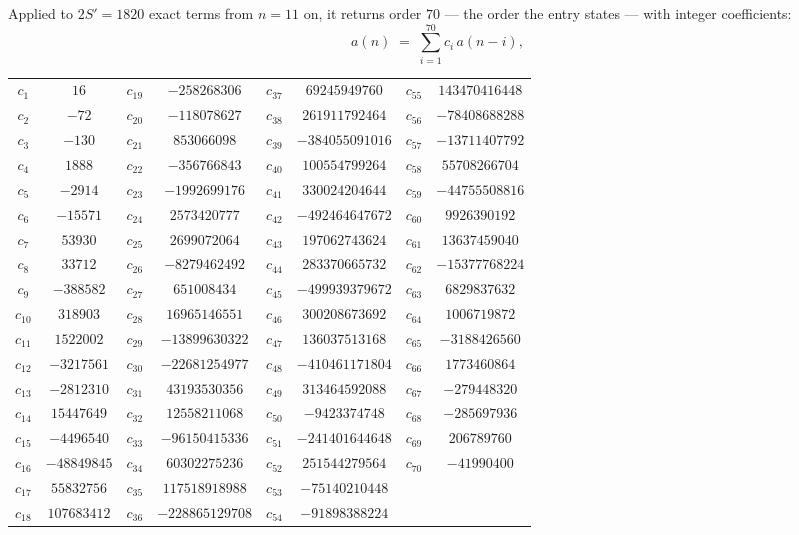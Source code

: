 \documentclass[11pt,a4paper]{article}
\theoremstyle{plain}
\theoremstyle{definition}
\begin{document}
Applied to $2S'=1820$ exact terms from $n=11$ on, it returns order $70$ --- the
order the entry states --- with integer coefficients:
\[
a(n)\;=\;\sum_{i=1}^{70}c_i\,a(n-i),
\]
\begin{center}\small
\begin{tabular}{cccccccc}
$c_{1}$ & $16$ & $c_{19}$ & $-258268306$ & $c_{37}$ & $69245949760$ & $c_{55}$ & $143470416448$ \\
$c_{2}$ & $-72$ & $c_{20}$ & $-118078627$ & $c_{38}$ & $261911792464$ & $c_{56}$ & $-78408688288$ \\
$c_{3}$ & $-130$ & $c_{21}$ & $853066098$ & $c_{39}$ & $-384055091016$ & $c_{57}$ & $-13711407792$ \\
$c_{4}$ & $1888$ & $c_{22}$ & $-356766843$ & $c_{40}$ & $100554799264$ & $c_{58}$ & $55708266704$ \\
$c_{5}$ & $-2914$ & $c_{23}$ & $-1992699176$ & $c_{41}$ & $330024204644$ & $c_{59}$ & $-44755508816$ \\
$c_{6}$ & $-15571$ & $c_{24}$ & $2573420777$ & $c_{42}$ & $-492464647672$ & $c_{60}$ & $9926390192$ \\
$c_{7}$ & $53930$ & $c_{25}$ & $2699072064$ & $c_{43}$ & $197062743624$ & $c_{61}$ & $13637459040$ \\
$c_{8}$ & $33712$ & $c_{26}$ & $-8279462492$ & $c_{44}$ & $283370665732$ & $c_{62}$ & $-15377768224$ \\
$c_{9}$ & $-388582$ & $c_{27}$ & $651008434$ & $c_{45}$ & $-499939379672$ & $c_{63}$ & $6829837632$ \\
$c_{10}$ & $318903$ & $c_{28}$ & $16965146551$ & $c_{46}$ & $300208673692$ & $c_{64}$ & $1006719872$ \\
$c_{11}$ & $1522002$ & $c_{29}$ & $-13899630322$ & $c_{47}$ & $136037513168$ & $c_{65}$ & $-3188426560$ \\
$c_{12}$ & $-3217561$ & $c_{30}$ & $-22681254977$ & $c_{48}$ & $-410461171804$ & $c_{66}$ & $1773460864$ \\
$c_{13}$ & $-2812310$ & $c_{31}$ & $43193530356$ & $c_{49}$ & $313464592088$ & $c_{67}$ & $-279448320$ \\
$c_{14}$ & $15447649$ & $c_{32}$ & $12558211068$ & $c_{50}$ & $-9423374748$ & $c_{68}$ & $-285697936$ \\
$c_{15}$ & $-4496540$ & $c_{33}$ & $-96150415336$ & $c_{51}$ & $-241401644648$ & $c_{69}$ & $206789760$ \\
$c_{16}$ & $-48849845$ & $c_{34}$ & $60302275236$ & $c_{52}$ & $251544279564$ & $c_{70}$ & $-41990400$ \\
$c_{17}$ & $55832756$ & $c_{35}$ & $117518918988$ & $c_{53}$ & $-75140210448$ &  &  \\
$c_{18}$ & $107683412$ & $c_{36}$ & $-228865129708$ & $c_{54}$ & $-91898388224$ &  &  \\
\end{tabular}
\end{center}
\end{document}
